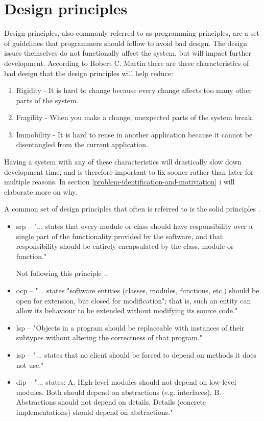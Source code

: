 \documentclass{report}
\begin{document}
\section{Design principles}
\label{design-principles}
Design principles, also commonly referred to as programming principles, are a set of guidelines that programmers should follow to avoid bad design. The design issues themselves do not functionally affect the system, but will impact further development. According to Robert C. Martin \cite{robertcmartinprinciples} there are three characteristics of bad design that the design principles will help reduce:

\begin{enumerate}
	\item Rigidity - It is hard to change because every change affects too many other parts of the system.
	\item Fragility - When you make a change, unexpected parts of the system break.
	\item Immobility - It is hard to reuse in another application because it cannot be disentangled from the current application.
\end{enumerate}

Having a system with any of these characteristics will drastically slow down development time, and is therefore important to fix sooner rather than later for multiple reasons. In section \ref{problem-identification-and-motiviation} i will elaborate more on why.

A common set of design principles that often is referred to is the \gls{solid} principles \cite{solid}.

\begin{itemize}
    \item \gls{srp} -- "... states that every module or class should have responsibility over a single part of the functionality provided by the software, and that responsibility should be entirely encapsulated by the class, module or function." \cite{srp}
    
    Not following this principle .. 
    \item \gls{ocp} -- "... states "software entities (classes, modules, functions, etc.) should be open for extension, but closed for modification"; that is, such an entity can allow its behaviour to be extended without modifying its source code." \cite{ocp}
    \item \gls{lsp} -- "Objects in a program should be replaceable with instances of their subtypes without altering the correctness of that program." \cite{lsp}
    \item \gls{isp} -- "... states that no client should be forced to depend on methods it does not use." \cite{isp}
    \item \gls{dip} --  "... states: \newline A. High-level modules should not depend on low-level modules. Both should depend on abstractions (e.g. interfaces). \newline
B. Abstractions should not depend on details. Details (concrete implementations) should depend on abstractions." \cite{dip}
\end{itemize}
    
\end{document}

